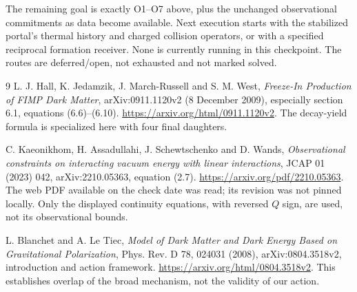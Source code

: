 \documentclass[11pt]{article}
\begin{document}
The remaining goal is exactly O1--O7 above, plus the unchanged observational
commitments as data become available. Next execution starts with the
stabilized portal's thermal history and charged collision operators, or with a
specified reciprocal formation receiver. None is currently running in this
checkpoint. The routes are deferred/open, not exhausted and not marked solved.

\begin{thebibliography}{9}
 L. J. Hall, K. Jedamzik, J. March-Russell and S. M. West,
\emph{Freeze-In Production of FIMP Dark Matter}, arXiv:0911.1120v2
(8 December 2009), especially section 6.1, equations (6.6)--(6.10).
\url{https://arxiv.org/html/0911.1120v2}.
The decay-yield formula is specialized here with four final daughters.

 C. Kaeonikhom, H. Assadullahi, J. Schewtschenko and D. Wands,
\emph{Observational constraints on interacting vacuum energy with linear
interactions}, JCAP 01 (2023) 042, arXiv:2210.05363,
equation (2.7). \url{https://arxiv.org/pdf/2210.05363}.
The web PDF available on the check date was read; its revision was not pinned
locally. Only the displayed continuity equations, with reversed $Q$ sign,
are used, not its observational bounds.

 L. Blanchet and A. Le Tiec,
\emph{Model of Dark Matter and Dark Energy Based on Gravitational Polarization},
Phys. Rev. D 78, 024031 (2008), arXiv:0804.3518v2,
introduction and action framework.
\url{https://arxiv.org/html/0804.3518v2}.
This establishes overlap of the broad mechanism, not the validity of our action.
\end{thebibliography}
\end{document}

